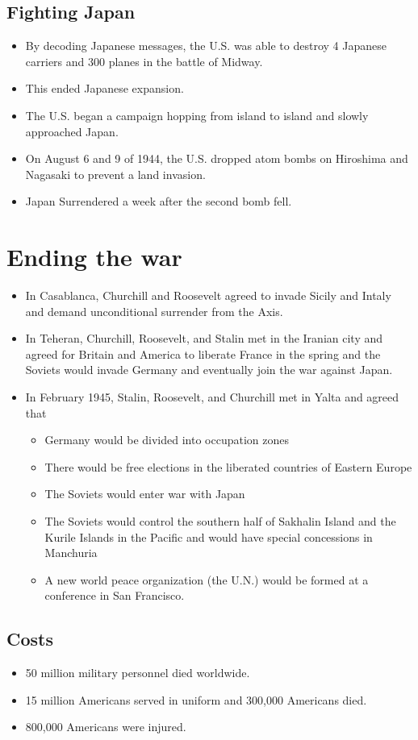 \documentclass[12pt]{article} %
\begin{document}
	\subsection{Fighting Japan}
	\begin{itemize}
		\item By decoding Japanese messages, the U.S. was able to destroy 4 Japanese carriers and 300 planes in the 
			battle of Midway.
		\item This ended Japanese expansion.
		\item The U.S. began a campaign hopping from island to island and slowly approached Japan.
		\item On August 6 and 9 of 1944, the U.S. dropped atom bombs on Hiroshima and Nagasaki to prevent a land invasion.
		\item Japan Surrendered a week after the second bomb fell.
	\end{itemize}

	\section{Ending the war}
	\begin{itemize}
		\item In Casablanca, Churchill and Roosevelt agreed to invade Sicily and Intaly and demand unconditional surrender 
			from the Axis.
		\item In Teheran, Churchill, Roosevelt, and Stalin met in the Iranian city and agreed for Britain and America to 
			liberate France in the spring and the Soviets would invade Germany and eventually join the war against Japan.
		\item In February 1945, Stalin, Roosevelt, and Churchill met in Yalta and agreed that 
		\begin{itemize}
			\item Germany would be divided into occupation zones
			\item There would be free elections in the liberated countries of Eastern Europe
			\item The Soviets would enter war with Japan
			\item The Soviets would control the southern half of Sakhalin Island and the Kurile Islands in the Pacific 
				and would have special concessions in Manchuria
			\item A new world peace organization (the U.N.) would be formed at a conference in San Francisco.
		\end{itemize}
	\end{itemize}

	\subsection{Costs}
	\begin{itemize}
		\item 50 million military personnel died worldwide.
		\item 15 million Americans served in uniform and 300,000 Americans died.
		\item 800,000 Americans were injured.
	\end{itemize}

	\newpage
\end{document}
